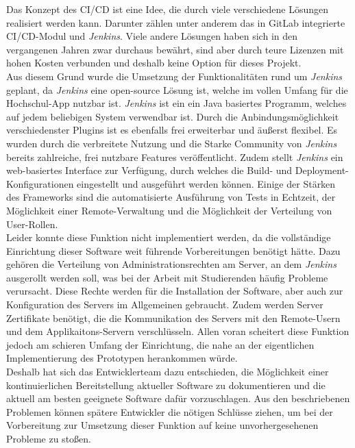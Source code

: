 Das Konzept des \ac{CI}/\ac{CD} ist eine Idee, die durch viele verschiedene Lösungen realisiert werden kann. Darunter zählen unter anderem das in GitLab integrierte \ac{CI}/\ac{CD}-Modul und \textit{Jenkins}. Viele andere Lösungen haben sich in den vergangenen Jahren zwar durchaus bewährt, sind aber durch teure Lizenzen mit hohen Kosten verbunden und deshalb keine Option für dieses Projekt.\\
\linebreak
Aus diesem Grund wurde die Umsetzung der Funktionalitäten rund um \textit{Jenkins} geplant, da \textit{Jenkins} eine open-source Lösung ist, welche im vollen Umfang für die Hochschul-\ac{App} nutzbar ist. \textit{Jenkins} ist ein ein Java basiertes Programm, welches auf jedem beliebigen System verwendbar ist. Durch die Anbindungsmöglichkeit verschiedenster Plugins ist es ebenfalls frei erweiterbar und äußerst flexibel. Es wurden durch die verbreitete Nutzung und die Starke Community von \textit{Jenkins} bereits zahlreiche, frei nutzbare Features veröffentlicht. Zudem stellt \textit{Jenkins} ein web-basiertes Interface zur Verfügung, durch welches die Build- und Deployment-Konfigurationen eingestellt und ausgeführt werden können. Einige der Stärken des Frameworks sind die automatisierte Ausführung von Tests in Echtzeit, der Möglichkeit einer Remote-Verwaltung und die Möglichkeit der Verteilung von User-Rollen.\\
\linebreak
Leider konnte diese Funktion nicht implementiert werden, da die vollständige Einrichtung dieser Software weit führende Vorbereitungen benötigt hätte. Dazu gehören die Verteilung von Administrationsrechten am Server, an dem \textit{Jenkins} ausgerollt werden soll, was bei der Arbeit mit Studierenden häufig Probleme verursacht. Diese Rechte werden für die Installation der Software, aber auch zur Konfiguration des Servers im Allgemeinen gebraucht. Zudem werden Server Zertifikate benötigt, die die Kommunikation des Servers mit den Remote-Usern und dem Applikaitons-Servern verschlüsseln. Allen voran scheitert diese Funktion jedoch am schieren Umfang der Einrichtung, die nahe an der eigentlichen Implementierung des Prototypen herankommen würde.\\
\linebreak
Deshalb hat sich das Entwicklerteam dazu entschieden, die Möglichkeit einer kontinuierlichen Bereitstellung aktueller Software zu dokumentieren und die aktuell am besten geeignete Software dafür vorzuschlagen. Aus den beschriebenen Problemen können spätere Entwickler die nötigen Schlüsse ziehen, um bei der Vorbereitung zur Umsetzung dieser Funktion auf keine unvorhergesehenen Probleme zu stoßen.

